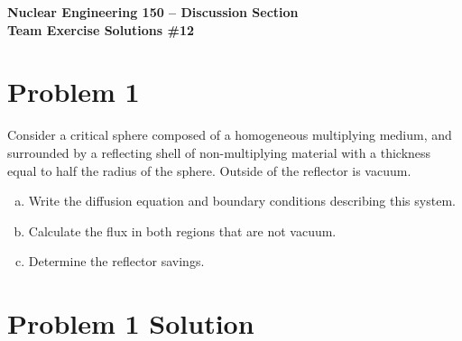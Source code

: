 \documentclass{report}
\begin{document}
\begin{center}
\textbf{\large Nuclear Engineering 150 -- Discussion Section}\\ 
\textbf{Team Exercise Solutions \#12}
\end{center}

\section*{Problem 1}

Consider a critical sphere composed of a homogeneous multiplying medium, and surrounded by a reflecting shell of non-multiplying material with a thickness equal to half the radius of the sphere. Outside of the reflector is vacuum.
\begin{enumerate}[a)]
\item Write the diffusion equation and boundary conditions describing this system.
\item Calculate the flux in both regions that are not vacuum.
\item Determine the reflector savings.
\end{enumerate}



\section*{Problem 1 Solution}
\end{document}
